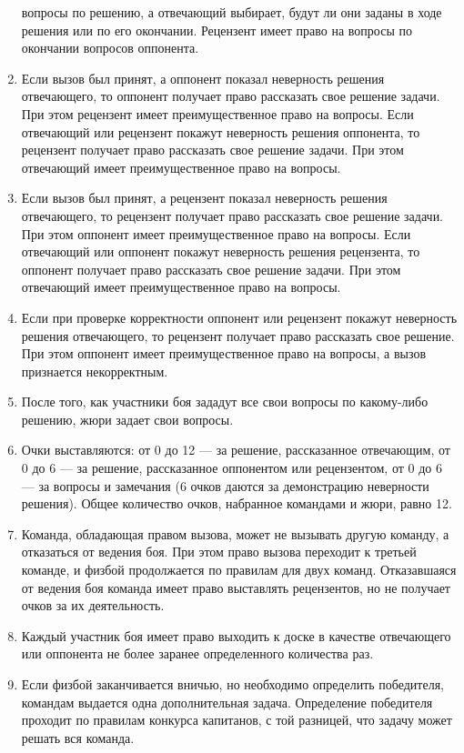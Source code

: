 \documentclass[11pt]{article}
\begin{document}
\begin{enumerate}
  вопросы по решению, а отвечающий выбирает, будут ли они заданы в
  ходе решения или по его окончании. Рецензент имеет право на вопросы
  по окончании вопросов оппонента.
\item Если вызов был принят, а оппонент показал неверность решения
  отвечающего, то оппонент получает право рассказать свое решение
  задачи. При этом рецензент имеет преимущественное право на
  вопросы. Если отвечающий или рецензент покажут неверность решения
  оппонента, то рецензент получает право рассказать свое решение
  задачи. При этом отвечающий имеет преимущественное право на вопросы.
\item Если вызов был принят, а рецензент показал неверность решения
  отвечающего, то рецензент получает право рассказать свое решение
  задачи. При этом оппонент имеет преимущественное право на
  вопросы. Если отвечающий или оппонент покажут неверность решения
  рецензента, то оппонент получает право рассказать свое решение
  задачи. При этом отвечающий имеет преимущественное право на вопросы.
\item Если при проверке корректности оппонент или рецензент покажут
  неверность решения отвечающего, то рецензент получает право
  рассказать свое решение. При этом оппонент имеет преимущественное
  право на вопросы, а вызов признается некорректным.
\item После того, как участники боя зададут все свои вопросы по
  какому-либо решению, жюри задает свои вопросы.
\item Очки выставляются: от 0 до 12 --- за решение, рассказанное
  отвечающим, от 0 до 6 --- за решение, рассказанное оппонентом или
  рецензентом, от 0 до 6 --- за вопросы и замечания (6 очков даются за
  демонстрацию неверности решения). Общее количество очков, набранное
  командами и жюри, равно 12.
\item Команда, обладающая правом вызова, может не вызывать другую
  команду, а отказаться от ведения боя. При этом право вызова
  переходит к третьей команде, и физбой продолжается по правилам для
  двух команд. Отказавшаяся от ведения боя команда имеет право
  выставлять рецензентов, но не получает очков за их деятельность.
\item Каждый участник боя имеет право выходить к доске в качестве
  отвечающего или оппонента не более заранее определенного количества
  раз.
\item Если физбой заканчивается вничью, но необходимо определить
  победителя, командам выдается одна дополнительная
  задача. Определение победителя проходит по правилам конкурса
  капитанов, с той разницей, что задачу может решать вся команда.
\end{enumerate}
\end{document}
